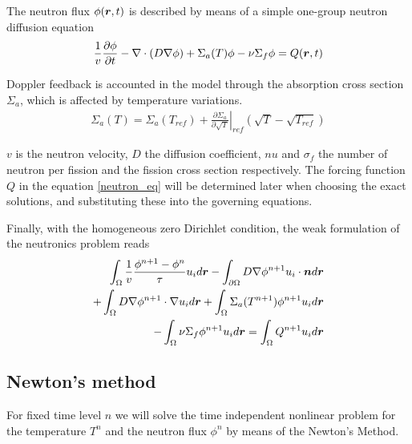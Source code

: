 The neutron flux $\phi(\boldsymbol{r},t)$ is described by means of a simple one-group neutron diffusion equation
\begin{align}
  \frac{1}{v} \frac{\partial\phi}{\partial t} 
  - \nabla\cdot(D \nabla \phi) 
  + \Sigma_{a}(T) \phi 
  - \nu \Sigma_{f} \phi
  = Q(\boldsymbol{r},t) \label{neutron_eq}
\end{align}

Doppler feedback is accounted in the model through the absorption cross section $\Sigma_{a}$, which is affected by temperature variations.
\begin{align}
  \Sigma_{a}(T) = \Sigma_{a}(T_{ref}) 
  + \left. \frac{\partial \Sigma_{a}}{\partial \sqrt{T}}\right|_{ref} 
    \left( \sqrt{T} - \sqrt{T_{ref}} \right)
\end{align}

$v$ is the neutron velocity, $D$ the diffusion coefficient, $nu$ and $\sigma_{f}$ the number of neutron per fission and the fission cross section respectively.  The forcing function $Q$ in the equation \eqref{neutron_eq} will be determined later when choosing the exact solutions, and substituting these into the governing equations.

Finally, with the homogeneous zero Dirichlet condition, the weak formulation of the neutronics problem reads
\begin{align}
  \int_{\Omega} \frac{1}{v} \frac{\phi^{n+1}-\phi{^n}}{\tau} u_i d\boldsymbol{r} 
  - \int_{\partial\Omega} D \nabla \phi^{n+1} u_i \cdot \boldsymbol{n} d\boldsymbol{r}& \nonumber \\
  + \int_{\Omega} D \nabla \phi^{n+1} \cdot \nabla u_i d\boldsymbol{r} 
  + \int_{\Omega} \Sigma_{a}(T^{n+1}) \phi^{n+1} u_i d\boldsymbol{r}& \nonumber \\
  - \int_{\Omega} \nu \Sigma_{f} \phi^{n+1} u_i d\boldsymbol{r} 
  = \int_{\Omega} Q^{n+1} u_i d\boldsymbol{r}&
\end{align}


\subsection*{Newton's method}
For fixed time level $n$ we will solve the time independent nonlinear problem for the temperature $T^{n}$ and the neutron flux $\phi^{n}$ by means of the Newton's Method.


